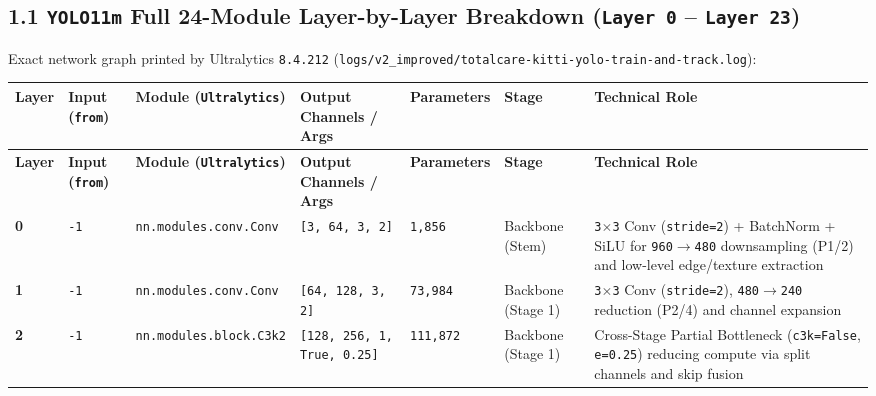 \documentclass[10.5pt,a4paper]{article}
\begin{document}
\subsection{1.1 \texttt{YOLO11m} Full 24-Module Layer-by-Layer Breakdown (\texttt{Layer 0} -- \texttt{Layer 23})}

Exact network graph printed by Ultralytics \texttt{8.\allowbreak{}4.\allowbreak{}212} (\texttt{logs/\allowbreak{}v2\_\allowbreak{}improved/\allowbreak{}totalcare-\allowbreak{}kitti-\allowbreak{}yolo-\allowbreak{}train-\allowbreak{}and-\allowbreak{}track.\allowbreak{}log}):



\begin{footnotesize}
\setlength{\tabcolsep}{4pt}
\setlength{\LTleft}{0pt}\setlength{\LTright}{0pt}
\begin{longtable}{>{\raggedright\arraybackslash}p{} >{\raggedright\arraybackslash}p{} >{\raggedright\arraybackslash}p{} >{\raggedright\arraybackslash}p{} >{\raggedright\arraybackslash}p{} >{\raggedright\arraybackslash}p{} >{\raggedright\arraybackslash}p{}}
\toprule
\textbf{Layer} & \textbf{Input (\texttt{from})} & \textbf{Module (\texttt{Ultralytics})} & \textbf{Output Channels / Args} & \textbf{Parameters} & \textbf{Stage} & \textbf{Technical Role} \\
\midrule
\endfirsthead
\toprule
\textbf{Layer} & \textbf{Input (\texttt{from})} & \textbf{Module (\texttt{Ultralytics})} & \textbf{Output Channels / Args} & \textbf{Parameters} & \textbf{Stage} & \textbf{Technical Role} \\
\midrule
\endhead
\bottomrule
\endfoot
\textbf{0} & \texttt{-\allowbreak{}1} & \texttt{nn.\allowbreak{}modules.\allowbreak{}conv.\allowbreak{}Conv} & \texttt{[3,\allowbreak{} 64,\allowbreak{} 3,\allowbreak{} 2]} & \texttt{1,\allowbreak{}856} & Backbone (Stem) & \texttt{3$\times$3} Conv (\texttt{stride=2}) + BatchNorm + SiLU for \texttt{960$\rightarrow$480} downsampling (P1/2) and low-level edge/texture extraction \\
\textbf{1} & \texttt{-\allowbreak{}1} & \texttt{nn.\allowbreak{}modules.\allowbreak{}conv.\allowbreak{}Conv} & \texttt{[64,\allowbreak{} 128,\allowbreak{} 3,\allowbreak{} 2]} & \texttt{73,\allowbreak{}984} & Backbone (Stage 1) & \texttt{3$\times$3} Conv (\texttt{stride=2}), \texttt{480$\rightarrow$240} reduction (P2/4) and channel expansion \\
\textbf{2} & \texttt{-\allowbreak{}1} & \texttt{nn.\allowbreak{}modules.\allowbreak{}block.\allowbreak{}C3k2} & \texttt{[128,\allowbreak{} 256,\allowbreak{} 1,\allowbreak{} True,\allowbreak{} 0.\allowbreak{}25]} & \texttt{111,\allowbreak{}872} & Backbone (Stage 1) & Cross-Stage Partial Bottleneck (\texttt{c3k=False}, \texttt{e=0.\allowbreak{}25}) reducing compute via split channels and skip fusion \\

\end{longtable}
\end{footnotesize}
\end{document}
